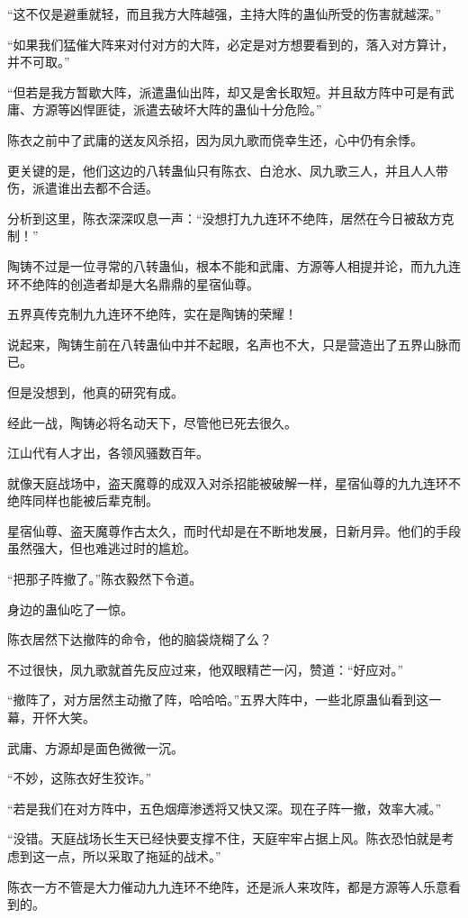 \begin{this_body}
“这不仅是避重就轻，而且我方大阵越强，主持大阵的蛊仙所受的伤害就越深。”

“如果我们猛催大阵来对付对方的大阵，必定是对方想要看到的，落入对方算计，并不可取。”

“但若是我方暂歇大阵，派遣蛊仙出阵，却又是舍长取短。并且敌方阵中可是有武庸、方源等凶悍匪徒，派遣去破坏大阵的蛊仙十分危险。”

陈衣之前中了武庸的送友风杀招，因为凤九歌而侥幸生还，心中仍有余悸。

更关键的是，他们这边的八转蛊仙只有陈衣、白沧水、凤九歌三人，并且人人带伤，派遣谁出去都不合适。

分析到这里，陈衣深深叹息一声：“没想打九九连环不绝阵，居然在今日被敌方克制！”

陶铸不过是一位寻常的八转蛊仙，根本不能和武庸、方源等人相提并论，而九九连环不绝阵的创造者却是大名鼎鼎的星宿仙尊。

五界真传克制九九连环不绝阵，实在是陶铸的荣耀！

说起来，陶铸生前在八转蛊仙中并不起眼，名声也不大，只是营造出了五界山脉而已。

但是没想到，他真的研究有成。

经此一战，陶铸必将名动天下，尽管他已死去很久。

江山代有人才出，各领风骚数百年。

就像天庭战场中，盗天魔尊的成双入对杀招能被破解一样，星宿仙尊的九九连环不绝阵同样也能被后辈克制。

星宿仙尊、盗天魔尊作古太久，而时代却是在不断地发展，日新月异。他们的手段虽然强大，但也难逃过时的尴尬。

“把那子阵撤了。”陈衣毅然下令道。

身边的蛊仙吃了一惊。

陈衣居然下达撤阵的命令，他的脑袋烧糊了么？

不过很快，凤九歌就首先反应过来，他双眼精芒一闪，赞道：“好应对。”

“撤阵了，对方居然主动撤了阵，哈哈哈。”五界大阵中，一些北原蛊仙看到这一幕，开怀大笑。

武庸、方源却是面色微微一沉。

“不妙，这陈衣好生狡诈。”

“若是我们在对方阵中，五色烟瘴渗透将又快又深。现在子阵一撤，效率大减。”

“没错。天庭战场长生天已经快要支撑不住，天庭牢牢占据上风。陈衣恐怕就是考虑到这一点，所以采取了拖延的战术。”

陈衣一方不管是大力催动九九连环不绝阵，还是派人来攻阵，都是方源等人乐意看到的。


\end{this_body}
